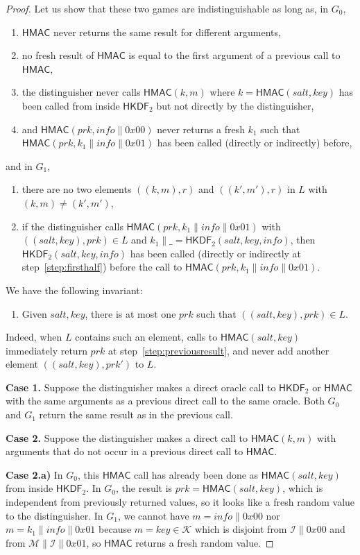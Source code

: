 \documentclass[compsoc, conference, letterpaper, 10pt, times]{IEEEtran}
\makeatletter
\newcommand{\HKDF}{\mathsf{HKDF}}
\newcommand{\pname}[1]{\item[#1.]\def\@currentlabel{#1}}
\newcommand{\hkdftwo}{\HKDF_2}
\newcommand{\salt}{\mathit{salt}}
\newcommand{\key}{\mathit{key}}
\newcommand{\info}{\mathit{info}}
\newcommand{\prk}{\mathit{prk}}
\newcommand{\hmac}{\mathsf{HMAC}}
\newcommand{\Skey}{\mathcal{K}}
\newcommand{\Sinfo}{\mathcal{I}}
\newcommand{\Smac}{\mathcal{M}}
\makeatother
\begin{document}
\begin{proof}
Let us show that these two games are indistinguishable as long as, 
in $G_0$, 
\begin{enumerate}[leftmargin=*]
\pname{H1}\label{H1}$\hmac$ never returns the same result for different arguments, %
\pname{H2}\label{H2}
no fresh result of $\hmac$ is equal to the first argument of a previous call to $\hmac$, %
\pname{H3}\label{H3}the distinguisher never calls $\hmac(k,m)$ where $k = \hmac(\salt,\key)$ has been called from inside $\hkdftwo$ but not directly by the distinguisher, %
\pname{H4}\label{H4}
and $\hmac(\prk,\info\|0x00)$ never returns a fresh $k_1$ such that $\hmac(\prk,k_1\|\info\|0x01)$ has been called (directly or indirectly) before, %
\end{enumerate}
and in $G_1$, 
\begin{enumerate}[leftmargin=*]
\pname{H5}\label{H5}
there are no two elements $((k,m),r)$ and $((k',m'),r)$ in $L$ with $(k,m) \neq (k',m')$, %
\pname{H6}\label{H7}
if the distinguisher calls $\hmac(\prk, k_1\|\info\|0x01)$ with $((\salt,\key),\prk) \in L$ and $k_1\|\_ = \hkdftwo(\salt,\key,\info)$, then $\hkdftwo(\salt,\key,\info)$ has been called (directly or indirectly at step~\ref{step:firsthalf}) before the call to $\hmac(\prk, k_1\|\info\|0x01)$.
\end{enumerate}
We have the following invariant:
\begin{enumerate}[leftmargin=*]
\pname{P1}\label{P1} Given $\salt,\key$, there is at most one $\prk$ such that $((\salt,\key),\prk) \in L$.
\end{enumerate}
Indeed, when $L$ contains such an element, calls to
$\hmac(\salt,\key)$ immediately return $\prk$ at
step~\ref{step:previousresult}, and never add another element
$((\salt,\key),\prk')$ to $L$.

{\bf Case 1.} Suppose the distinguisher makes a direct oracle call to $\hkdftwo$ or $\hmac$ 
with the same arguments as a previous direct call to the same oracle.
Both $G_0$ and $G_1$ return the same result as in the previous call.

\medskip
{\bf Case 2.} Suppose the distinguisher makes a direct call to $\hmac(k,m)$
with arguments that do not occur in a previous direct call to $\hmac$.

{\bf Case 2.a)} In $G_0$, this $\hmac$ call has already been done as $\hmac(\salt,\key)$ from inside
$\hkdftwo$.
  In $G_0$, the result is $\prk = \hmac(\salt,\key)$, which is independent from previously
  returned values, so it looks like a fresh random value to the distinguisher.
In $G_1$, we cannot have $m = \info \| 0x00$ nor $m = k_1 \| \info \| 0x01$ because $m = \key \in \Skey$ which is disjoint from $\Sinfo \| 0x00$ and from $\Smac \| \Sinfo \| 0x01$, so $\hmac$ returns a fresh random value.


\end{proof}
\end{document}
